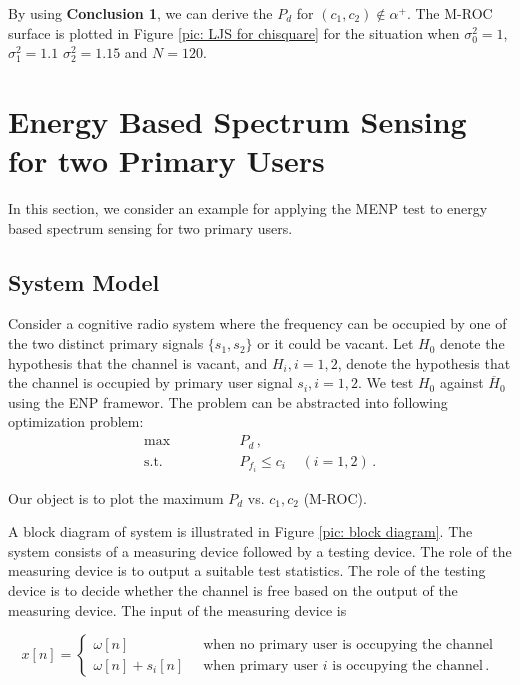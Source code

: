 \documentclass[12pt,journal,a4paper,twoside,onecolumn,draft]{IEEEtran}
\begin{document}
\begin{spacing}{2.5}
By using \textbf{Conclusion 1}, we can derive the $P_d$ for $(c_1, c_2) \notin \alpha^+$.
The M-ROC surface is plotted in Figure \ref{pic: LJS for chisquare} for the situation when $\sigma_0^2 = 1$, $\sigma_1^2 = 1.1$ $\sigma_2^2 = 1.15$ and $N=120$.

\section{Energy Based Spectrum Sensing for two Primary Users}
In this section, we consider an example for applying the MENP test to energy based spectrum sensing for two primary users.

\subsection{System Model}
Consider a cognitive radio system where the frequency can be occupied by one of the two  distinct primary signals $\{ s_1, s_2 \}$ or it could be vacant.
Let  $H_0$  denote the hypothesis that the channel is vacant, and $H_i, i = 1, 2$, denote the hypothesis that the channel is occupied by primary user signal $s_i, i=1, 2$. We test $H_0$ against $\overline{H}_0$ using the ENP framewor. The problem can be abstracted into following optimization problem:
\begin{equation}
  \label{equ: energy spectrum sensing}
  \begin{split}
  \max \;\;\;\;\;\;\;\;\;\;\;\;\;\;\; &P_d\,,\\
  \text{s.t.} \;\;\;\;\;\;\;\;\;\;\;\;\;\;\; &P_{f_i} \leq c_i\;\;\;\;(i = 1, 2)\,.
  \end{split}
\end{equation}

Our object is to plot the maximum $P_d$ vs. $c_1, c_2$ (M-ROC).

A block diagram of system is illustrated in Figure \ref{pic: block diagram}. The system consists of a measuring device followed by a testing device. The role of the measuring device is to output a suitable test statistics. The role of the testing device is to decide whether the channel is free based on the output of the measuring device. The input of the measuring device is

\begin{equation}
  \label{equ: expression of x}
  x[n]=\begin{cases}
    \omega[n]\;\;\;\;\;\;\;\;\;\;\;\;\;\;&\text{when no primary user is occupying the channel}\\
    \omega[n] + s_i[n]\;\;&\text{when primary user $i$ is occupying the channel}\,.
  \end{cases}
\end{equation}


\end{spacing}
\end{document}
